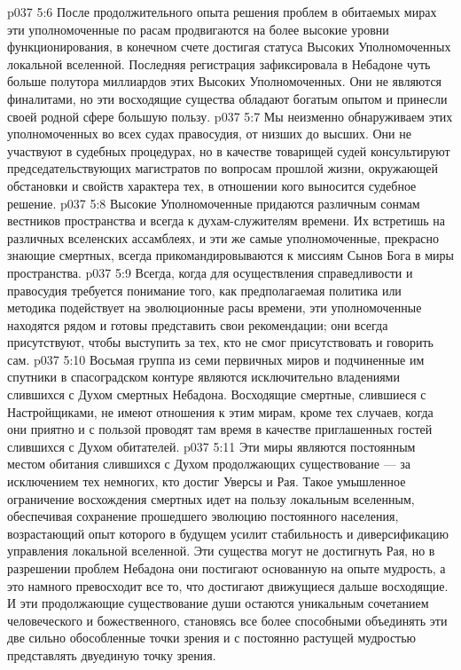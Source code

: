 \vs p037 5:6 После продолжительного опыта решения проблем в обитаемых мирах эти уполномоченные по расам продвигаются на более высокие уровни функционирования, в конечном счете достигая статуса Высоких Уполномоченных локальной вселенной. Последняя регистрация зафиксировала в Небадоне чуть больше полутора миллиардов этих Высоких Уполномоченных. Они не являются финалитами, но эти восходящие существа обладают богатым опытом и принесли своей родной сфере большую пользу.
\vs p037 5:7 Мы неизменно обнаруживаем этих уполномоченных во всех судах правосудия, от низших до высших. Они не участвуют в судебных процедурах, но в качестве товарищей судей консультируют председательствующих магистратов по вопросам прошлой жизни, окружающей обстановки и свойств характера тех, в отношении кого выносится судебное решение.
\vs p037 5:8 Высокие Уполномоченные придаются различным сонмам вестников пространства и всегда к духам\hyp{}служителям времени. Их встретишь на различных вселенских ассамблеях, и эти же самые уполномоченные, прекрасно знающие смертных, всегда прикомандировываются к миссиям Сынов Бога в миры пространства.
\vs p037 5:9 Всегда, когда для осуществления справедливости и правосудия требуется понимание того, как предполагаемая политика или методика подействует на эволюционные расы времени, эти уполномоченные находятся рядом и готовы представить свои рекомендации; они всегда присутствуют, чтобы выступить за тех, кто не смог присутствовать и говорить сам.
\vs p037 5:10 \pc {} Восьмая группа из семи первичных миров и подчиненные им спутники в спасоградском контуре являются исключительно владениями слившихся с Духом смертных Небадона. Восходящие смертные, слившиеся с Настройщиками, не имеют отношения к этим мирам, кроме тех случаев, когда они приятно и с пользой проводят там время в качестве приглашенных гостей слившихся с Духом обитателей.
\vs p037 5:11 Эти миры являются постоянным местом обитания слившихся с Духом продолжающих существование --- за исключением тех немногих, кто достиг Уверсы и Рая. Такое умышленное ограничение восхождения смертных идет на пользу локальным вселенным, обеспечивая сохранение прошедшего эволюцию постоянного населения, возрастающий опыт которого в будущем усилит стабильность и диверсификацию управления локальной вселенной. Эти существа могут не достигнуть Рая, но в разрешении проблем Небадона они постигают основанную на опыте мудрость, а это намного превосходит все то, что достигают движущиеся дальше восходящие. И эти продолжающие существование души остаются уникальным сочетанием человеческого и божественного, становясь все более способными объединять эти две сильно обособленные точки зрения и с постоянно растущей мудростью представлять двуединую точку зрения.
